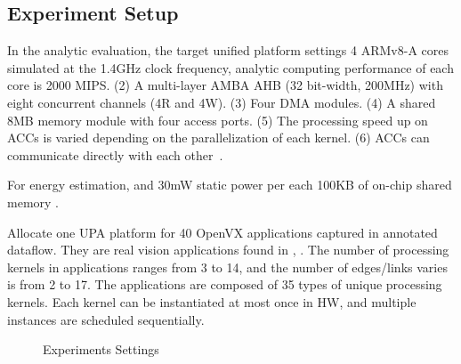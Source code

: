 \subsection{Experiment Setup}
\label{subsec:res-setup}

In the analytic evaluation, the target unified platform settings  4 ARMv8-A cores simulated at the 1.4GHz clock frequency, analytic computing performance of each core is 2000 MIPS. (2) A multi-layer AMBA AHB (32 bit-width, 200MHz) with eight concurrent channels (4R and 4W). (3) Four DMA modules. (4) A shared 8MB memory module with four access ports. (5) The processing speed up on ACCs is varied depending on the parallelization of each kernel. (6) ACCs can communicate directly with each other~\cite{teimouri2016improving}. 

For energy estimation,  and 30mW static power per each 100KB of on-chip shared memory \cite{malladi2012towards}.

Allocate one UPA platform for 40 OpenVX applications captured in annotated dataflow. 
They are real vision applications found in \cite{Intel}, \cite{AMD}. 
The number of processing kernels in applications ranges from 3 to 14, and the number of edges/links varies is from 2 to 17. 
The applications are composed of 35 types of unique processing kernels.
Each kernel can be instantiated at most once in HW, and multiple instances are scheduled sequentially.

\begin{figure}[h]
\vspace{-8pt}
	\centering
		\hfill
		\hfill
	\vspace{-8pt}
	\caption{Experiments Settings}
	\label{fig:avg}
\end{figure}

